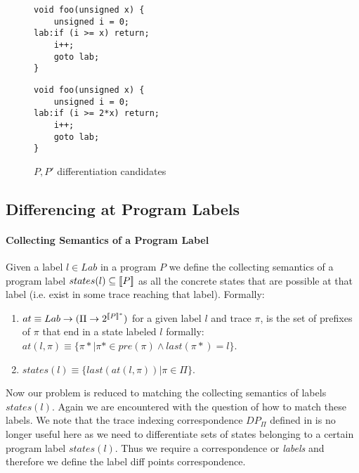 \begin{figure}[ht]
\begin{minipage}[b]{0.5\linewidth}
\centering
\begin{lstlisting}
void foo(unsigned x) {
    unsigned i = 0;
lab:if (i >= x) return;
    i++;
    goto lab;
}
\end{lstlisting}
\end{minipage}
\hspace{0.5cm}
\begin{minipage}[b]{0.5\linewidth}
\centering
\begin{lstlisting}
void foo(unsigned x) {
    unsigned i = 0;
lab:if (i >= 2*x) return;
    i++;
    goto lab;
}
\end{lstlisting}
\end{minipage}
\caption{$P,P'$ differentiation candidates}
\end{figure}

\subsection{Differencing at Program Labels} 

\paragraph{Collecting Semantics of a Program Label} 
Given a label $l \in Lab$ in a program $P$ we define the collecting semantics of a program label $states(l) \subseteq \lbrack\!\lbrack P \rbrack\!\rbrack$ as all the concrete states that are possible at that label (i.e. exist in some trace reaching that label). Formally:
\begin{enumerate}
\item $at \equiv Lab \rightarrow (\Pi \rightarrow 2^{\lbrack\!\lbrack P \rbrack\!\rbrack^*})$ for a given label $l$ and trace $\pi$, is the set of prefixes of $\pi$ that end in a state labeled $l$ formally: $at(l,\pi) \equiv \{\pi*|\pi* \in pre(\pi) \wedge last(\pi*)=l \}$.
\item $states(l) \equiv \{last(at(l,\pi)) | \pi \in \Pi\}$.
\end{enumerate}

Now our problem is reduced to matching the collecting semantics of labels $states(l)$. Again we are encountered with the question of how to match these labels. We note that the trace indexing correspondence $DP_{\Pi}$ defined in  is no longer useful here as we need to differentiate sets of states belonging to a certain program label $states(l)$. Thus we require a correspondence or \emph{labels} and therefore we define the label diff points correspondence.

